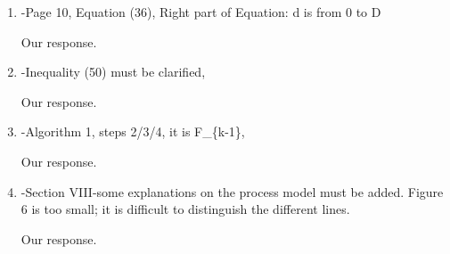 \documentclass[a4paper]{scrartcl}
\newenvironment{rebuttal}{\begin{enumerate}[label={\color{grey}\thesection.\arabic{enumi}},leftmargin=0pt,ref=\thesection.\arabic{enumi}]}{\end{enumerate}}
\newcommand{\reviewtext}[1]{{\color{nblue} #1}}
\begin{document}
\begin{rebuttal}
Due to the number of components in the proposed method (encoding, encryption and estimation) our aim was to present the algorithm pseudocode as the summary of the method, but regret that this was not made clearer. We have rewritten and reorganised the localisation section and have tried to make a pseudocode summary, and its purpose, clearer. We hope that the updated manuscript better captures the overall summary of all presented components at the end of introduced components.

\item \reviewtext{-Page 10, Equation (36), Right part of Equation: d is from 0 to D}

Our response.

\item \reviewtext{-Inequality (50) must be clarified,}

Our response.

\item \reviewtext{-Algorithm 1, steps 2/3/4, it is F\_\{k-1\},}

Our response.

\item \reviewtext{-Section VIII-some explanations on the process model must be added. Figure 6 is too small; it is difficult to distinguish the different lines.}

Our response.

\end{rebuttal}

\end{document}

